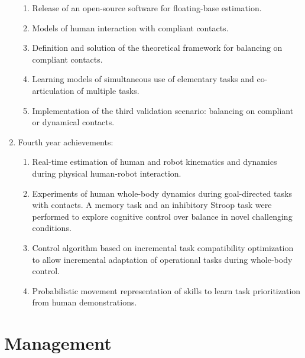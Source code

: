 \documentclass[12pt,a4paper,twoside]{article}
\begin{document}
\begin{enumerate}
\begin{enumerate}
\item Release of an open-source software for floating-base estimation.

\item Models of human interaction with compliant contacts.

\item Definition and solution of the theoretical framework for balancing on compliant contacts.

\item Learning models of simultaneous use of elementary tasks and co-articulation of multiple tasks.

\item Implementation of the third validation scenario: balancing on compliant or dynamical contacts.

\end{enumerate}

\item Fourth year achievements:
\begin{enumerate}
\item Real-time estimation of human and robot kinematics and dynamics during physical human-robot interaction. 

\item Experiments of human whole-body dynamics during goal-directed tasks with contacts. A memory task and an inhibitory Stroop task were performed to explore cognitive control over balance in novel challenging conditions.

\item Control algorithm based on incremental task compatibility optimization to allow incremental adaptation of operational tasks during whole-body control. 

\item Probabilistic movement representation of skills to learn task prioritization from human demonstrations. 
\end{enumerate}
\end{enumerate}

\section{Management}
\end{document}
